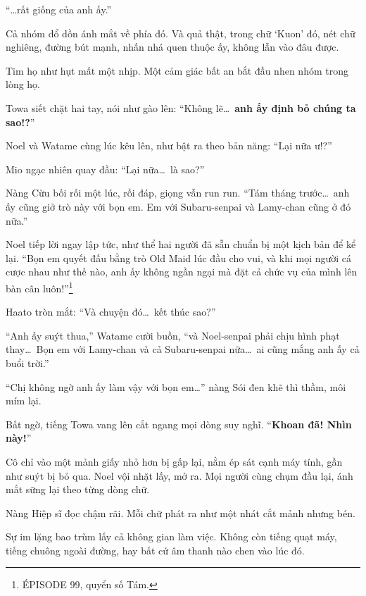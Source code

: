 \documentclass[../main.tex]{subfiles}
\begin{document}
``\dots rất giống của anh ấy.''

Cả nhóm đổ dồn ánh mắt về phía đó. Và quả thật, trong chữ `Kuon' đó, nét chữ nghiêng, đường bút mạnh, nhấn nhá quen thuộc ấy, không lẫn vào đâu được.

Tim họ như hụt mất một nhịp. Một cảm giác bất an bắt đầu nhen nhóm trong lòng họ.

Towa siết chặt hai tay, nói như gào lên: ``Không lẽ\dots\ \textbf{anh ấy định bỏ chúng ta sao!?}''

Noel và Watame cùng lúc kêu lên, như bật ra theo bản năng: ``Lại nữa ư!?''

Mio ngạc nhiên quay đầu: ``Lại nữa\dots\ là sao?''

Nàng Cừu bối rối một lúc, rồi đáp, giọng vẫn run run. ``Tám tháng trước\dots\ anh ấy cũng giở trò này với bọn em. Em với Subaru-senpai và Lamy-chan cũng ở đó nữa.''

Noel tiếp lời ngay lập tức, như thể hai người đã sẵn chuẩn bị một kịch bản để kể lại. ``Bọn em quyết đấu bằng trò Old Maid lúc đầu cho vui, và khi mọi người cá cược nhau như thế nào, anh ấy không ngần ngại mà đặt cả chức vụ của mình lên bàn cân luôn!''\footnote{{\flaregothic ÉPISODE 99}, quyển số Tám.}

Haato tròn mắt: ``Và chuyện đó\dots\ kết thúc sao?''

``Anh ấy suýt thua,'' Watame cười buồn, ``và Noel-senpai phải chịu hình phạt thay\dots\ Bọn em với Lamy-chan và cả Subaru-senpai nữa\dots\ ai cũng mắng anh ấy cả buổi trời.''

``Chị không ngờ anh ấy làm vậy với bọn em\dots'' nàng Sói đen khẽ thì thầm, môi mím lại.

Bất ngờ, tiếng Towa vang lên cắt ngang mọi dòng suy nghĩ. ``\textbf{Khoan đã! Nhìn này!}''

Cô chỉ vào một mảnh giấy nhỏ hơn bị gấp lại, nằm ép sát cạnh máy tính, gần như suýt bị bỏ qua. Noel vội nhặt lấy, mở ra. Mọi người cùng chụm đầu lại, ánh mắt sững lại theo từng dòng chữ.


Nàng Hiệp sĩ đọc chậm rãi. Mỗi chữ phát ra như một nhát cắt mảnh nhưng bén.

Sự im lặng bao trùm lấy cả không gian làm việc. Không còn tiếng quạt máy, tiếng chuông ngoài đường, hay bất cứ âm thanh nào chen vào lúc đó.
\end{document}
